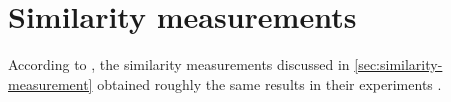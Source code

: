 \section{Similarity measurements}\label{sec:evaluation-sim-measurements}

According to \citeauthor{HfsentTrans2019}, the similarity measurements discussed in \autoref{sec:similarity-measurement} obtained roughly the same results in their experiments \cite{HfsentTrans2019}.   
